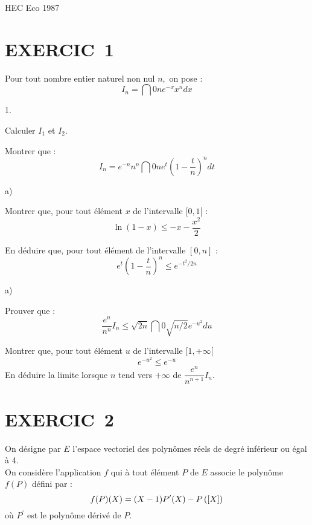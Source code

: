 \documentclass[11pt]{article}%
\begin{document}
\begin{center}
{\huge HEC Eco 1987}
\end{center}

\section*{EXERCIC\E\ 1}

Pour tout nombre entier naturel non nul $n,$ on pose :
\[
I_{n} = \dint{0}{n}e^{-x}x^{n}dx
\]

\begin{noliste}{1.}
 \setlength{\itemsep}{4mm}
\item Calculer $I_{1}$ et $I_{2}.$

\item Montrer que :
\[
I_{n} = e^{-n}n^{n}\dint{0}{n}e^{t}(1-\dfrac{t}{n})^{n}dt
\]

\item 

\begin{noliste}{a)}
 \setlength{\itemsep}{2mm}
\item Montrer que, pour tout élément $x$ de l'intervalle $[0,1[$ :
\[
\ln (1-x)\leq -x-\dfrac{x^{2}}{2}
\]

\item En déduire que, pour tout élément de l'intervalle $[0,n]$ :
\[
e^{t}\left( 1-\dfrac{t}{n}\right) ^{n}\leq e^{-t^{2}/2n}
\]
\end{noliste}

\item 

\begin{noliste}{a)}
 \setlength{\itemsep}{2mm}
\item Prouver que :
\[
\dfrac{e^{n}}{n^{n}}I_{n}\leq \sqrt{2n}\dint{0}{\sqrt{n/2}}e^{-u^{2}}du
\]

\item Montrer que, pour tout élément $u$ de l'intervalle $[1, + \infty
\lbrack 
$
\[
e^{-u^{2}}\leq e^{-u}
\]
En déduire la limite lorsque $n$ tend vers $ + \infty $ de
$\dfrac{e^{n}}{n^{n + 1}}I_{n}.$
\end{noliste}
\end{noliste}

\section*{EXERCIC\E\ 2}

On désigne par $E$ l'espace vectoriel des polynômes réels de degré
inférieur
ou égal à 4.\\
On considère l'application $f$ qui à tout élément $P$ de $E$ associe le
polynôme $f(P)$ défini par :
\[
f(P)(X) = (X-1)P^{\prime }(X)-P\left(\left[ {X} \right]\right)
\]
où $P^{\prime }$ est le polynôme dérivé de $P.$
\end{document}
